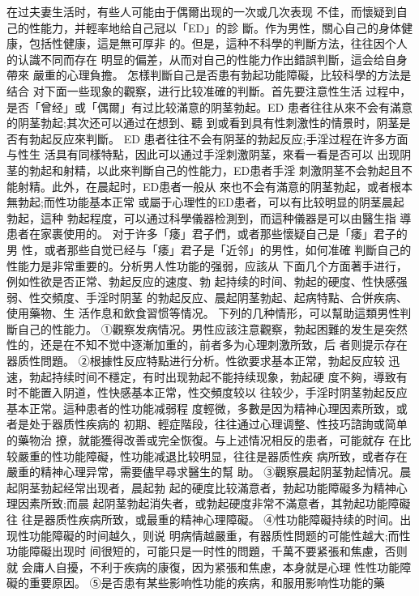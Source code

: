 \documentclass[12pt,UTF8]{ctexbook}
\begin{document}
在过夫妻生活时，有些人可能由于偶爾出现的一次或几次表现
不佳，而懷疑到自己的性能力，并輕率地给自己冠以「ED」的診
斷。作为男性，關心自己的身体健康，包括性健康，這是無可厚非
的。但是，這种不科學的判斷方法，往往因个人的认識不同而存在
明显的偏差，从而对自己的性能力作出錯誤判斷，這会给自身帶來
嚴重的心理負擔。
怎樣判斷自己是否患有勃起功能障礙，比较科學的方法是结合
对下面一些现象的觀察，进行比较准確的判斷。首先要注意性生活
过程中，是否「曾经」或「偶爾」有过比较滿意的阴茎勃起。ED
患者往往从來不会有滿意的阴茎勃起;其次还可以通过在想到、聽
到或看到具有性刺激性的情景时，阴茎是否有勃起反应來判斷。
ED 患者往往不会有阴茎的勃起反应;手淫过程在许多方面与性生
活具有同樣特點，因此可以通过手淫刺激阴茎，來看一看是否可以
出现阴茎的勃起和射精，以此來判斷自己的性能力，ED患者手淫
刺激阴茎不会勃起且不能射精。此外，在晨起时，ED患者一般从
來也不会有滿意的阴茎勃起，或者根本無勃起;而性功能基本正常
或屬于心理性的ED患者，可以有比较明显的阴茎晨起勃起，這种
勃起程度，可以通过科學儀器检測到，而這种儀器是可以由醫生指
導患者在家裹使用的。
对于许多「痿」君子們，或者那些懷疑自己是「痿」君子的男
性，或者那些自觉已经与「痿」君子是「近邻」的男性，如何准確
判斷自己的性能力是非常重要的。分析男人性功能的强弱，应該从
下面几个方面著手进行，例如性欲是否正常、勃起反应的速度、勃
起持续的时间、勃起的硬度、性快感强弱、性交頻度、手淫时阴茎
的勃起反应、晨起阴茎勃起、起病特點、合併疾病、使用藥物、生
活作息和飲食習惯等情况。
下列的几种情形，可以幫助這類男性判斷自己的性能力。
①觀察发病情况。男性应該注意觀察，勃起困難的发生是突然
性的，还是在不知不觉中逐漸加重的，前者多为心理刺激所致，后
者则提示存在器质性問題。
②根據性反应特點进行分析。性欲要求基本正常，勃起反应较
迅速，勃起持续时间不穩定，有时出现勃起不能持续现象，勃起硬
度不夠，導致有时不能置入阴道，性快感基本正常，性交頻度较以
往较少，手淫时阴茎勃起反应基本正常。這种患者的性功能减弱程
度輕微，多數是因为精神心理因素所致，或者是处于器质性疾病的
初期、輕症階段，往往通过心理调整、性技巧諮詢或简单的藥物治
撩，就能獲得改善或完全恢復。与上述情况相反的患者，可能就存
在比较嚴重的性功能障礙，性功能减退比较明显，往往是器质性疾
病所致，或者存在嚴重的精神心理异常，需要儘早尋求醫生的幫
助。
③觀察晨起阴茎勃起情况。晨起阴茎勃起经常出现者，晨起勃
起的硬度比较滿意者，勃起功能障礙多为精神心理因素所致;而晨
起阴茎勃起消失者，或勃起硬度非常不滿意者，其勃起功能障礙往
往是器质性疾病所致，或最重的精神心理障礙。
④性功能障礙持续的时间。出现性功能障礙的时间越久，则说
明病情越嚴重，有器质性問题的可能性越大;而性功能障礙出现时
间很短的，可能只是一时性的問題，千萬不要紧張和焦慮，否则就
会庸人自擾，不利于疾病的康復，因为紧張和焦慮，本身就是心理
性性功能障礙的重要原因。
⑤是否患有某些影响性功能的疾病，和服用影响性功能的藥
\end{document}

